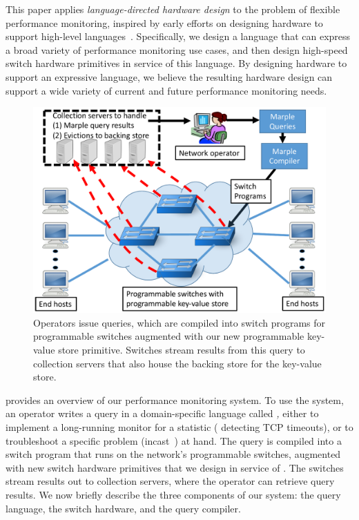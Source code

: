 This paper applies {\em language-directed hardware design} to the problem of
flexible performance monitoring, inspired by early efforts on designing
hardware to support high-level
languages~\cite{language-directed-computer-design, ditzel_patterson, soar}.
Specifically, we design a language that can express a broad variety of
performance monitoring use cases, and then design high-speed switch hardware
primitives in service of this language. By designing hardware to support an
expressive language, we believe the resulting hardware design can support a
wide variety of current and future performance monitoring needs.

\begin{figure}[!t]
\includegraphics[width=\columnwidth]{pq_overview.pdf}
\caption{Operators issue \TheSystem queries, which are compiled into switch
programs for programmable switches augmented with our new programmable
key-value store primitive. Switches stream results from this query to
collection servers that also house the backing store for the key-value store.}
\label{fig:overview}
\end{figure}

 provides an overview of our performance monitoring system. To
use the system, an operator writes a query in a domain-specific language called
{\em \TheSystem,} either to implement a long-running monitor for a statistic (\eg
detecting TCP timeouts), or to troubleshoot a specific problem (\eg incast~\cite{tcpincast}) at hand. The
query is compiled into a switch program that runs on the network's programmable
switches, augmented with new switch hardware primitives that we design in
service of \TheSystem.  The switches stream results out to collection servers,
where the operator can retrieve query results. We now briefly describe the
three components of our system: the query language, the switch hardware, and
the query compiler.

